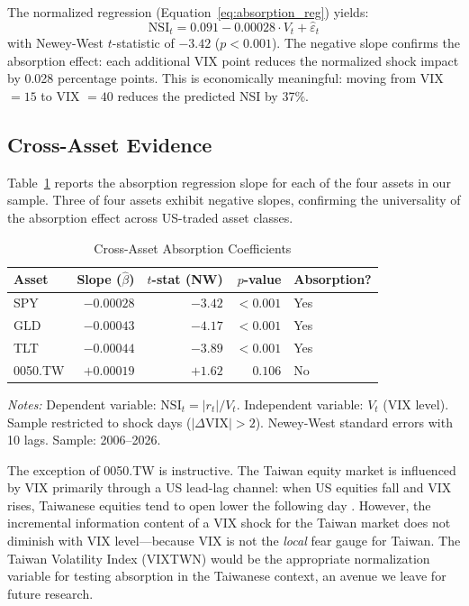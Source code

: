 \documentclass[12pt,a4paper]{article}
\begin{document}
The normalized regression (Equation~\ref{eq:absorption_reg}) yields:
\begin{equation}
\text{NSI}_t = 0.091 - 0.00028 \cdot V_t + \hat{\varepsilon}_t
\label{eq:absorption_result}
\end{equation}
with Newey-West $t$-statistic of $-3.42$ ($p < 0.001$). The negative slope confirms the absorption effect: each additional VIX point reduces the normalized shock impact by 0.028 percentage points. This is economically meaningful: moving from VIX $= 15$ to VIX $= 40$ reduces the predicted NSI by 37\%.

\subsection{Cross-Asset Evidence}
\label{sec:cross_asset}

Table~\ref{tab:cross_asset} reports the absorption regression slope for each of the four assets in our sample. Three of four assets exhibit negative slopes, confirming the universality of the absorption effect across US-traded asset classes.

\begin{table}[H]
\centering
\caption{Cross-Asset Absorption Coefficients}
\label{tab:cross_asset}
\begin{threeparttable}
\begin{tabular}{lrrrl}
\toprule
Asset & Slope ($\hat{\beta}$) & $t$-stat (NW) & $p$-value & Absorption? \\
\midrule
SPY     & $-0.00028$ & $-3.42$ & $< 0.001$ & Yes \\
GLD     & $-0.00043$ & $-4.17$ & $< 0.001$ & Yes \\
TLT     & $-0.00044$ & $-3.89$ & $< 0.001$ & Yes \\
0050.TW & $+0.00019$ & $+1.62$ & $0.106$   & No  \\
\bottomrule
\end{tabular}
\begin{tablenotes}
\small
\item \textit{Notes:} Dependent variable: $\text{NSI}_t = |r_t| / V_t$. Independent variable: $V_t$ (VIX level). Sample restricted to shock days ($|\Delta\text{VIX}| > 2$). Newey-West standard errors with 10 lags. Sample: 2006--2026.
\end{tablenotes}
\end{threeparttable}
\end{table}

The exception of 0050.TW is instructive. The Taiwan equity market is influenced by VIX primarily through a US lead-lag channel: when US equities fall and VIX rises, Taiwanese equities tend to open lower the following day \citep{lin2020}. However, the incremental information content of a VIX shock for the Taiwan market does not diminish with VIX level---because VIX is not the \textit{local} fear gauge for Taiwan. The Taiwan Volatility Index (VIXTWN) would be the appropriate normalization variable for testing absorption in the Taiwanese context, an avenue we leave for future research.
\end{document}
